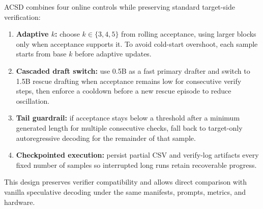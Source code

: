 ACSD combines four online controls while preserving standard target-side
verification:
\begin{enumerate}
      \item \textbf{Adaptive $k$:} choose $k\in\{3,4,5\}$ from rolling acceptance,
        using larger blocks only when acceptance supports it. To avoid cold-start
        overshoot, each sample starts from base $k$ before adaptive updates.
  \item \textbf{Cascaded draft switch:} use 0.5B as a fast primary drafter and
        switch to 1.5B rescue drafting when acceptance remains low for
        consecutive verify steps, then enforce a cooldown before a new rescue
        episode to reduce oscillation.
  \item \textbf{Tail guardrail:} if acceptance stays below a threshold after a
        minimum generated length for multiple consecutive checks, fall back to
        target-only autoregressive decoding for the remainder of that sample.
  \item \textbf{Checkpointed execution:} persist partial CSV and verify-log
        artifacts every fixed number of samples so interrupted long runs retain
        recoverable progress.
\end{enumerate}

This design preserves verifier compatibility and allows direct comparison with
vanilla speculative decoding under the same manifests, prompts, metrics, and
hardware.

